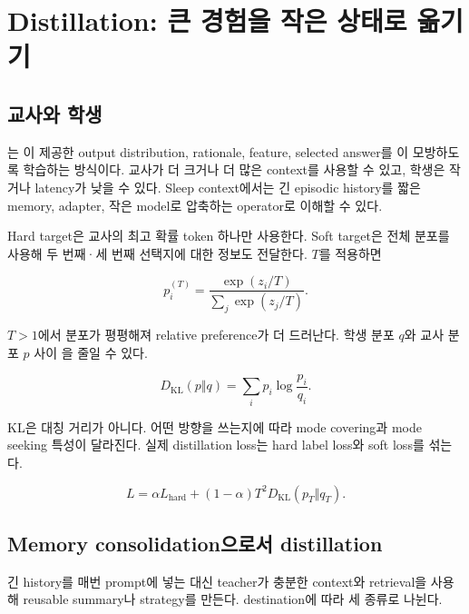 \chapter{Distillation: 큰 경험을 작은 상태로 옮기기}
\label{bg:chapter-distillation}

\section{교사와 학생}

는 이 제공한 output
distribution, rationale, feature, selected answer를 이
모방하도록 학습하는 방식이다. 교사가 더 크거나 더 많은 context를 사용할 수 있고, 학생은
작거나 latency가 낮을 수 있다. Sleep context에서는 긴 episodic history를 짧은 memory,
adapter, 작은 model로 압축하는 operator로 이해할 수 있다.

Hard target은 교사의 최고 확률 token 하나만 사용한다. Soft target은 전체 분포를 사용해
두 번째·세 번째 선택지에 대한 정보도 전달한다.  $T$를 적용하면

\begin{equation}
  p_i^{(T)}=\frac{\exp(z_i/T)}{\sum_j\exp(z_j/T)}.
\end{equation}

$T>1$에서 분포가 평평해져 relative preference가 더 드러난다. 학생 분포 $q$와 교사 분포
$p$ 사이 을 줄일 수 있다.

\begin{equation}
  D_{\mathrm{KL}}(p\Vert q)=\sum_i p_i\log\frac{p_i}{q_i}.
  \label{eq:bg-kl}
\end{equation}

KL은 대칭 거리가 아니다. 어떤 방향을 쓰는지에 따라 mode covering과 mode seeking 특성이
달라진다. 실제 distillation loss는 hard label loss와 soft loss를 섞는다.

\begin{equation}
  L=\alpha L_{\mathrm{hard}}+(1-\alpha)T^2
  D_{\mathrm{KL}}(p_T\Vert q_T).
  \label{eq:bg-distill-loss}
\end{equation}

\section{Memory consolidation으로서 distillation}

긴 history를 매번 prompt에 넣는 대신 teacher가 충분한 context와 retrieval을 사용해 reusable
summary나 strategy를 만든다. destination에 따라 세 종류로 나뉜다.

